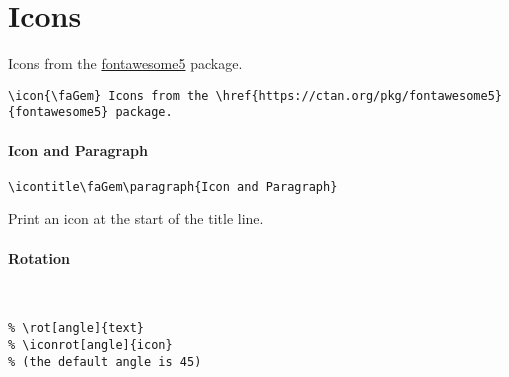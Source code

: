\documentclass[itdr]{subfiles}
\begin{document}
\vfill
\break

\section{Icons}

\icon{\faGem} Icons from the \href{https://ctan.org/pkg/fontawesome5}{fontawesome5} package.

\begin{lstlisting}
\icon{\faGem} Icons from the \href{https://ctan.org/pkg/fontawesome5}{fontawesome5} package.
\end{lstlisting}

\vfill

\icontitle\faGem\paragraph{Icon and Paragraph}

\begin{lstlisting}
\icontitle\faGem\paragraph{Icon and Paragraph}
\end{lstlisting}

Print an icon at the start of the title line.

\paragraph{Rotation}

 ~  \hfill \iconrot{\faArrowUp} ~ \fbox{\lstinline!\\iconrot\{\\faArrowUp\}!}

\begin{lstlisting}
% \rot[angle]{text}
% \iconrot[angle]{icon}
% (the default angle is 45)
\end{lstlisting}

\vfill
\end{document}
